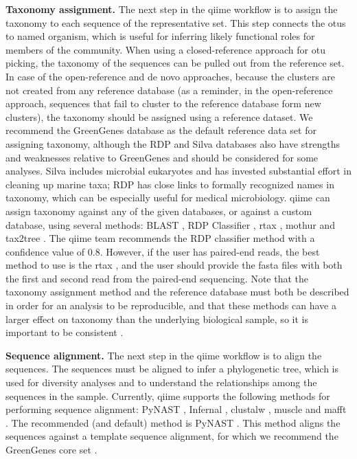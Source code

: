 \textbf{Taxonomy assignment.} The next step in the \gls{qiime} workflow is to
assign the taxonomy to each sequence of the representative set. This step connects
the \gls{otu}s to named organism, which is useful for inferring likely functional roles
for members of the community. When using a closed-reference approach for \gls{otu} picking,
the taxonomy of the sequences can be pulled out from the reference set. In case of
the open-reference and de novo approaches, because the clusters are not created from
any reference database (as a reminder, in the open-reference approach, sequences that
fail to cluster to the reference database form new clusters), the taxonomy should be
assigned using a reference dataset. We recommend the GreenGenes database
\cite{DeSantis2006, McDonald2012} as the default reference data set for assigning
taxonomy, although the RDP \cite{Cole2009} and Silva \cite{Quast2013} databases also
have strengths and weaknesses relative to GreenGenes and should be considered for some
analyses. Silva includes microbial eukaryotes and has invested substantial effort in
cleaning up marine taxa; RDP has close links to formally recognized names in taxonomy,
which can be especially useful for medical microbiology. \gls{qiime} can assign taxonomy
against any of the given databases, or against a custom database, using several
methods: BLAST \cite{Altschul1990}, RDP Classifier \cite{Wang2007}, rtax \cite{Soergel2012},
mothur \cite{Schloss2009} and tax2tree \cite{McDonald2012}. The \gls{qiime} team recommends
the RDP classifier method \cite{Wang2007} with a confidence value of 0.8. However, if
the user has paired-end reads, the best method to use is the rtax \cite{Soergel2012}, and
the user should provide the fasta files with both the first and second read from the
paired-end sequencing. Note that the taxonomy assignment method and the reference database
must both be described in order for an analysis to be reproducible, and that these methods
can have a larger effect on taxonomy than the underlying biological sample, so it is important
to be consistent \cite{Liu2008}.

\textbf{Sequence alignment.} The next step in the \gls{qiime} workflow is to align the
sequences. The sequences must be aligned to infer a phylogenetic tree, which is used for
diversity analyses and to understand the relationships among the sequences in the sample.
Currently, \gls{qiime} supports the following methods for performing sequence alignment:
PyNAST \cite{Caporaso2010PyNAST}, Infernal \cite{Nawrocki2009}, clustalw \cite{Larkin2007},
muscle \cite{Edgar2004} and mafft \cite{Katoh2002}. The recommended (and default) method is
PyNAST \cite{Caporaso2010PyNAST}. This method aligns the sequences against a template sequence
alignment, for which we recommend the GreenGenes core set \cite{DeSantis2006}.

